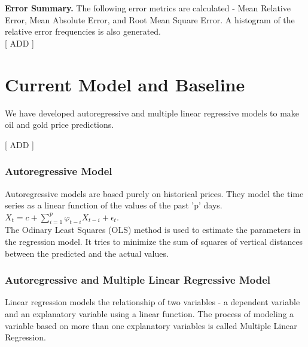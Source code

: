 \documentclass[runningheads]{llncs}
\begin{document}
\noindent \textbf	{Error Summary.} The following error metrics are calculated - Mean Relative Error, Mean Absolute Error, and Root Mean Square Error. A histogram of the relative error frequencies is also generated. \\

[ ADD ]


\newpage

\section{Current Model and Baseline}

We have developed autoregressive and multiple linear regressive models to make oil and gold price predictions.

[ ADD ]

\subsubsection{Autoregressive Model}
Autoregressive models are based purely on historical prices. They model the time series as a linear function of the values of the past 'p' days.\\

$ X_{t} = c + \sum\limits_{i=1}^p \varphi_{t-i}X_{t-i} + \epsilon_{t}$. \\

\noindent The Odinary Least Squares (OLS) method is used to estimate the parameters in the regression model. It tries to minimize the sum of squares of vertical distances between the predicted and the actual values. 

\subsubsection{Autoregressive and Multiple Linear Regressive Model}
Linear regression models the relationship of two variables - a dependent variable and an explanatory variable using a linear function. The process of modeling a variable based on more than one explanatory variables is called Multiple Linear Regression. \\
   
\end{document}
